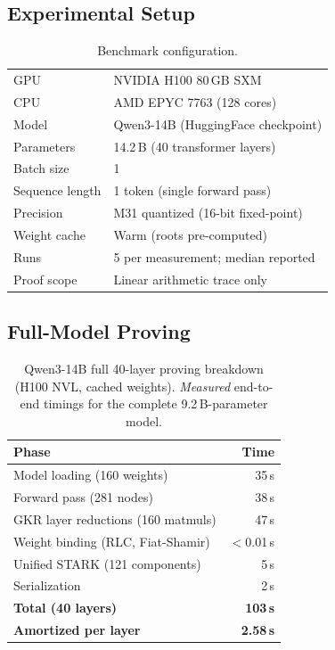 \documentclass[10pt,twocolumn]{article}
\theoremstyle{definition}
\theoremstyle{remark}
\begin{document}
\subsection{Experimental Setup}

\begin{table}[t]
  \centering\small
  \caption{Benchmark configuration.}
  \label{tab:setup}
  \begin{tabular}{@{}ll@{}}
    \toprule
    GPU              & NVIDIA H100 80\,GB SXM \\
    CPU              & AMD EPYC 7763 (128 cores) \\
    Model            & Qwen3-14B (HuggingFace checkpoint) \\
    Parameters       & 14.2\,B (40 transformer layers) \\
    Batch size       & 1 \\
    Sequence length  & 1 token (single forward pass) \\
    Precision        & M31 quantized (16-bit fixed-point) \\
    Weight cache     & Warm (roots pre-computed) \\
    Runs             & 5 per measurement; median reported \\
    Proof scope      & Linear arithmetic trace only \\
    \bottomrule
  \end{tabular}
\end{table}

\subsection{Full-Model Proving}

\begin{table}[t]
  \centering\small
  \caption{Qwen3-14B full 40-layer proving breakdown (H100 NVL,
           cached weights). \emph{Measured} end-to-end timings
           for the complete 9.2\,B-parameter model.}
  \label{tab:proving}
  \begin{tabular}{@{}lr@{}}
    \toprule
    \textbf{Phase} & \textbf{Time} \\
    \midrule
    Model loading (160 weights)       & 35\,s \\
    Forward pass (281 nodes)          & 38\,s \\
    GKR layer reductions (160 matmuls) & 47\,s \\
    Weight binding (RLC, Fiat-Shamir) & $<$0.01\,s \\
    Unified STARK (121 components)    & 5\,s \\
    Serialization                     & 2\,s \\
    \midrule
    \textbf{Total (40 layers)}        & \textbf{103\,s} \\
    \textbf{Amortized per layer}      & \textbf{2.58\,s} \\
    \bottomrule
  \end{tabular}
\end{table}
\end{document}
